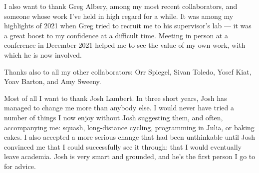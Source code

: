 I also want to thank Greg Albery, among my most recent collaborators, and someone whose work I've held in high regard for a while.
It was among my highlights of 2021 when Greg tried to recruit me to his supervisor's lab --- it was a great boost to my confidence at a difficult time.
Meeting in person at a conference in December 2021 helped me to see the value of my own work, with which he is now involved.

Thanks also to all my other collaborators: Orr Spiegel, Sivan Toledo, Yosef Kiat, Yoav Barton, and Amy Sweeny.

\medskip

Most of all I want to thank Josh Lambert.
In three short years, Josh has managed to change me more than anybody else.
I would never have tried a number of things I now enjoy without Josh suggesting them, and often, accompanying me: squash, long-distance cycling, programming in Julia, or baking cakes.
I also accepted a more serious change that had been unthinkable until Josh convinced me that I could successfully see it through: that I would eventually leave academia.
Josh is very smart and grounded, and he's the first person I go to for advice.

\endgroup
